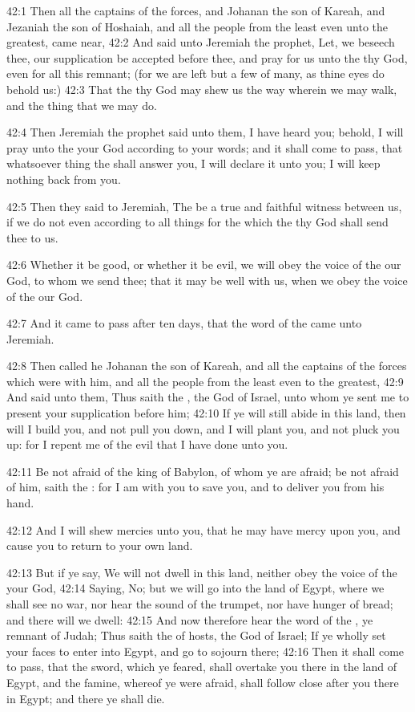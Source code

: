 42:1 Then all the captains of the forces, and Johanan the son of
Kareah, and Jezaniah the son of Hoshaiah, and all the people from the
least even unto the greatest, came near, 42:2 And said unto Jeremiah
the prophet, Let, we beseech thee, our supplication be accepted before
thee, and pray for us unto the \LORD thy God, even for all this
remnant; (for we are left but a few of many, as thine eyes do behold
us:) 42:3 That the \LORD thy God may shew us the way wherein we may
walk, and the thing that we may do.

42:4 Then Jeremiah the prophet said unto them, I have heard you;
behold, I will pray unto the \LORD your God according to your words;
and it shall come to pass, that whatsoever thing the \LORD shall answer
you, I will declare it unto you; I will keep nothing back from you.

42:5 Then they said to Jeremiah, The \LORD be a true and faithful
witness between us, if we do not even according to all things for the
which the \LORD thy God shall send thee to us.

42:6 Whether it be good, or whether it be evil, we will obey the voice
of the \LORD our God, to whom we send thee; that it may be well with
us, when we obey the voice of the \LORD our God.

42:7 And it came to pass after ten days, that the word of the \LORD
came unto Jeremiah.

42:8 Then called he Johanan the son of Kareah, and all the captains of
the forces which were with him, and all the people from the least even
to the greatest, 42:9 And said unto them, Thus saith the \LORD, the God
of Israel, unto whom ye sent me to present your supplication before
him; 42:10 If ye will still abide in this land, then will I build you,
and not pull you down, and I will plant you, and not pluck you up: for
I repent me of the evil that I have done unto you.

42:11 Be not afraid of the king of Babylon, of whom ye are afraid; be
not afraid of him, saith the \LORD: for I am with you to save you, and
to deliver you from his hand.

42:12 And I will shew mercies unto you, that he may have mercy upon
you, and cause you to return to your own land.

42:13 But if ye say, We will not dwell in this land, neither obey the
voice of the \LORD your God, 42:14 Saying, No; but we will go into the
land of Egypt, where we shall see no war, nor hear the sound of the
trumpet, nor have hunger of bread; and there will we dwell: 42:15 And
now therefore hear the word of the \LORD, ye remnant of Judah; Thus
saith the \LORD of hosts, the God of Israel; If ye wholly set your
faces to enter into Egypt, and go to sojourn there; 42:16 Then it
shall come to pass, that the sword, which ye feared, shall overtake
you there in the land of Egypt, and the famine, whereof ye were
afraid, shall follow close after you there in Egypt; and there ye
shall die.

